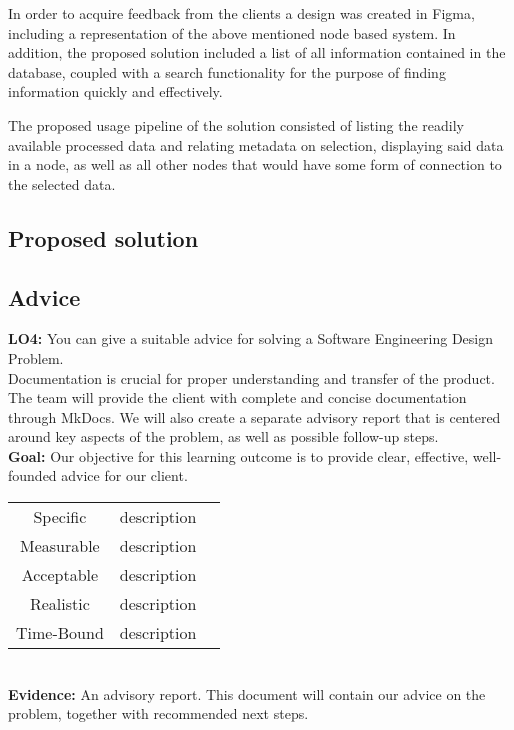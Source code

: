 In order to acquire feedback from the clients a design was created in Figma, including a representation of the above mentioned node based system. In addition, the proposed solution included a list of all information contained in the database, coupled with a search functionality for the purpose of finding information quickly and effectively.

The proposed usage pipeline of the solution consisted of listing the readily available processed data and relating metadata on selection, displaying said data in a node, as well as all other nodes that would have some form of connection to the selected data.


\subsection{Proposed solution}
\label{subsec:Proposed solution}

\subsection{Advice}
\label{subsec:Advice}

\textbf{LO4:} You can give a suitable advice for solving a Software Engineering Design Problem. \\

Documentation is crucial for proper understanding and transfer of the product. The team will provide the client with complete and concise documentation through MkDocs. We will also create a separate advisory report that is centered around key aspects of the problem, as well as possible follow-up steps. \\

\textbf{Goal:} Our objective for this learning outcome is to provide clear, effective, well-founded advice for our client.\\

\begin{tabular}{ |c|c|c| } 
	\hline
	Specific & description  \\ 
	Measurable & description  \\ 
	Acceptable & description  \\
	Realistic & description \\
	Time-Bound & description \\ 
	\hline
\end{tabular} \\

\textbf{Evidence:}
An advisory report. This document will contain our advice on the problem, together with recommended next steps. 


